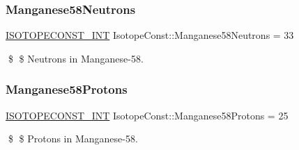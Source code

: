 \subsubsection{\texorpdfstring{Manganese58\+Neutrons}{Manganese58Neutrons}}
{\footnotesize\ttfamily \mbox{\hyperlink{group___isotope_const-_macros_ga5f18360b3e99483a35c32d789e62621c}{I\+S\+O\+T\+O\+P\+E\+C\+O\+N\+S\+T\+\_\+\+I\+NT}} Isotope\+Const\+::\+Manganese58\+Neutrons = 33}

\$ \$ Neutrons in Manganese-\/58. \mbox{\label{group___isotope_const-_manganese-_mn58_ga51f4d8408a18696a6d2684a6196ee3d5}} 
\subsubsection{\texorpdfstring{Manganese58\+Protons}{Manganese58Protons}}
{\footnotesize\ttfamily \mbox{\hyperlink{group___isotope_const-_macros_ga5f18360b3e99483a35c32d789e62621c}{I\+S\+O\+T\+O\+P\+E\+C\+O\+N\+S\+T\+\_\+\+I\+NT}} Isotope\+Const\+::\+Manganese58\+Protons = 25}

\$ \$ Protons in Manganese-\/58. 